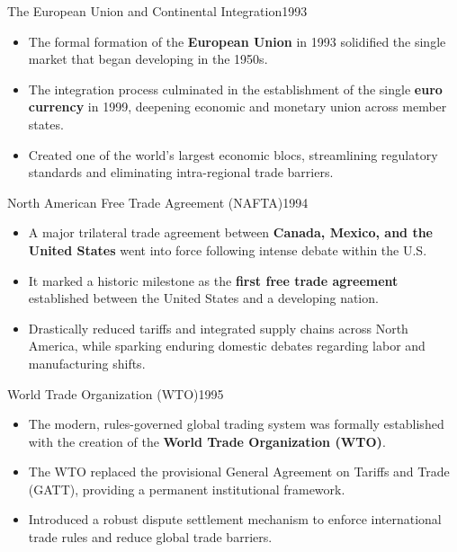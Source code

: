 \documentclass[10pt, aspectratio=169]{beamer}
\begin{document}
	\begin{frame}{The European Union and Continental Integration}{1993}
		\begin{itemize}
			\item The formal formation of the \textbf{European Union} in 1993 solidified the single market that began developing in the 1950s.
			\vspace{0.25cm}
			\item The integration process culminated in the establishment of the single \textbf{euro currency} in 1999, deepening economic and monetary union across member states.
			\vspace{0.25cm}
			\item Created one of the world's largest economic blocs, streamlining regulatory standards and eliminating intra-regional trade barriers.
		\end{itemize}
	\end{frame}
	
	\begin{frame}{North American Free Trade Agreement (NAFTA)}{1994}
		\begin{itemize}
			\item A major trilateral trade agreement between \textbf{Canada, Mexico, and the United States} went into force following intense debate within the U.S.
			\vspace{0.25cm}
			\item It marked a historic milestone as the \textbf{first free trade agreement} established between the United States and a developing nation.
			\vspace{0.25cm}
			\item Drastically reduced tariffs and integrated supply chains across North America, while sparking enduring domestic debates regarding labor and manufacturing shifts.
		\end{itemize}
	\end{frame}
	
	\begin{frame}{World Trade Organization (WTO)}{1995}
		\begin{itemize}
			\item The modern, rules-governed global trading system was formally established with the creation of the \textbf{World Trade Organization (WTO)}.
			\vspace{0.25cm}
			\item The WTO replaced the provisional General Agreement on Tariffs and Trade (GATT), providing a permanent institutional framework.
			\vspace{0.25cm}
			\item Introduced a robust dispute settlement mechanism to enforce international trade rules and reduce global trade barriers.
		\end{itemize}
	\end{frame}
	
\end{document}
